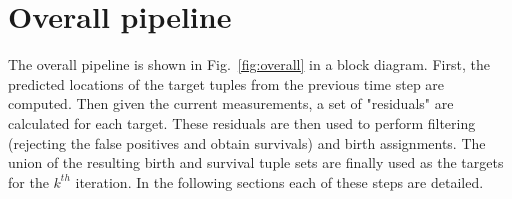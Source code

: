 \documentclass[runningheads]{llncs}
\begin{document}
%
%
%

\section{Overall pipeline}\label{sec:overall}
The overall pipeline is shown in Fig.~\ref{fig:overall} in a block diagram. First, the predicted locations of the target tuples from the previous time step are computed. Then given the current measurements, a set of "residuals" are calculated for each target. These residuals are then used to perform filtering (rejecting the false positives and obtain survivals) and birth assignments. The union of the resulting birth and survival tuple sets are finally used as the targets for the $k^{th}$ iteration. In the following sections each of these steps are detailed.
\end{document}
